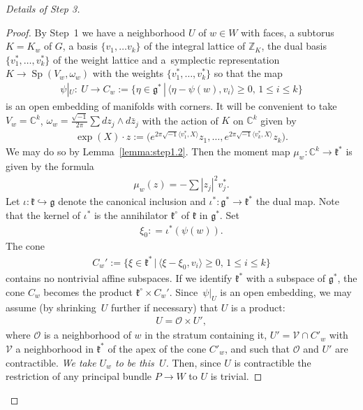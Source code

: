 \documentclass[pdftex]{sigma}
\numberwithin{equation}{section}
\begin{document}
\begin{proof}[Details of Step 3]
\begin{proof}
By Step~1  we have a
  neighborhood $U$ of $w\in W$ with faces, a subtorus $K=K_w$ of $G$, a basis
  $\{v_1,\ldots v_k\}$ of the integral lattice of ${\mathbb Z}_K$, the dual
  basis $\{v_1^*,\ldots, v_k^*\}$ of the weight lattice and  a~symplectic representation $K\to \operatorname{Sp}(V_w, \omega_w)$ with the weights
  $\{v_1^*,\ldots, v_k^*\}$
  so that the map
\begin{gather*}
\psi|_{U}\colon \ U\to C_w:= \{ \eta \in{\mathfrak g}^* \,|\, \langle \eta - \psi(w),
v_i\rangle \geq 0, \, 1\leq i\leq k\}
\end{gather*}
is an open embedding of manifolds with
corners.
It will be convenient to take $V_w= {\mathbb C}^k$, $\omega_w=
\frac{\sqrt{-1}}{2\pi}\sum dz_j \wedge d\bar{z}_j$ with the  action
of $K$ on ${\mathbb C}^k$ given by
\begin{gather*}
\exp (X)\cdot z:= \big(e^{2\pi \sqrt{-1}\langle v_1^*, X\rangle} z_1, \ldots,
e^{2\pi \sqrt{-1}\langle v_k^*, X\rangle} z_k\big).
\end{gather*}
We may do so by Lemma~\ref{lemma:step1.2}.
Then the moment map $\mu_w\colon {\mathbb C}^k\to {\mathfrak k}^*$ is given by the formula
\begin{gather*}
\mu_w (z) = -\sum |z_j|^2 v_j^*.
\end{gather*}
Let $\iota\colon {\mathfrak k}\hookrightarrow {\mathfrak g}$ denote the canonical inclusion and
$\iota^*\colon  {\mathfrak g}^*\to {\mathfrak k}^*$ the dual map.  Note that the kernel of $\iota^*$
is the annihilator ${\mathfrak k}^\circ $ of ${\mathfrak k}$ in ${\mathfrak g}^*$. Set
\begin{gather*}
\xi_0: = \iota^* (\psi (w)).
\end{gather*}
The cone
\begin{gather*}
C_w':= \big\{ \xi \in{\mathfrak k}^* \,|\, \langle \xi - \xi_0,
v_i\rangle \geq 0, \, 1\leq i\leq k\big\}
\end{gather*}
contains no nontrivial af\/f\/ine subspaces.
If we identify ${\mathfrak k}^*$ with a subspace of ${\mathfrak g}^*$,
the cone $C_w$ becomes the product ${\mathfrak k}^\circ \times C_w'$.
Since~$\psi|_{U}$ is an open embedding, we may assume (by shrinking~$U$
further if necessary) that $U$ is a product:
\begin{gather*}
U= {\mathcal O}\times U',
\end{gather*}
where ${\mathcal O}$ is a neighborhood of $w$ in the stratum containing it,
 $U' = {\mathcal V} \cap C'_w$
with ${\mathcal V}$ a neighborhood in ${\mathfrak k}^*$ of the apex of the cone $C'_w$,
and such that ${\mathcal O}$ and $U'$ are contractible.
{\it We take $U_w$ to be this~$U$.}
 Then, since $U$ is contractible
the restriction of any principal bundle $P\to W$ to $U$ is trivial.


\end{proof}
\end{proof}
\end{document}
